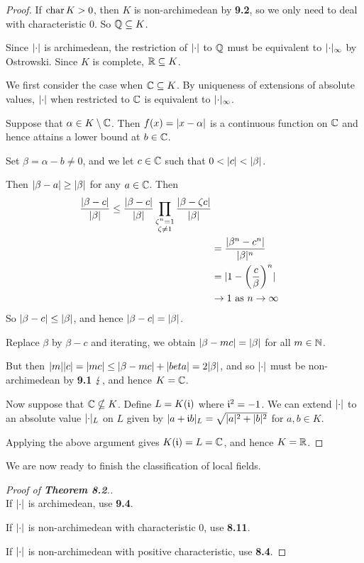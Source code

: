 \documentclass[10pt,a4paper]{article}
\begin{document}
\begin{proof}
  If $\operatorname{char} K > 0$, then $K$ is non-archimedean by \textbf{9.2}, so we only need to deal with characteristic 0. So $\mathbb{Q} \subseteq K$.

  Since $\lvert\cdot\rvert$ is archimedean, the restriction of $\lvert\cdot\rvert$ to $\mathbb{Q}$ must be equivalent to $\lvert\cdot\rvert_\infty$ by Ostrowski. Since $K$ is complete, $\mathbb{R} \subseteq K$.

  We first consider the case when $\mathbb{C} \subseteq K$. By uniqueness of extensions of absolute values, $\lvert\cdot\rvert$ when restricted to $\mathbb{C}$ is equivalent to $\lvert\cdot\rvert_\infty$.

  Suppose that $\alpha \in K \setminus \mathbb{C}$. Then $f(x)=\lvert x-\alpha\rvert$ is a continuous function on $\mathbb{C}$ and hence attains a lower bound at $b \in \mathbb{C}$.

  Set $\beta = \alpha - b \neq 0$, and we let $c \in \mathbb{C}$ such that $0<\lvert c\rvert<\lvert\beta\rvert$.

  Then $\lvert\beta-a\rvert \geq \lvert\beta\rvert$ for any $a \in \mathbb{C}$. Then
  \begin{align*}
    \frac{\lvert\beta-c\rvert}{\lvert\beta\rvert} \leq \frac{\lvert\beta-c\rvert}{\lvert\beta\rvert} \prod_{\substack{\zeta^n = 1\\\zeta\neq 1}} \frac{\lvert\beta-\zeta c\rvert}{\lvert\beta\rvert} \\
    &= \frac{\lvert\beta^n-c^n\rvert}{\lvert\beta\rvert^n}\\
    &=\lvert1-\left(\frac{c}{\beta}\right)^n\rvert\\
    &\to 1 \text{ as } n \to \infty
  \end{align*}
  So $\lvert\beta-c\rvert\leq \lvert\beta\rvert$, and hence $\lvert\beta-c\rvert = \lvert\beta\rvert$.

  Replace $\beta$ by $\beta-c$ and iterating, we obtain $\lvert\beta-mc\rvert = \lvert\beta\rvert$ for all $m \in \mathbb{N}$.

  But then $\lvert m\rvert\lvert c\rvert = \lvert mc\rvert \leq \lvert\beta-mc\rvert+\lvert beta\rvert = 2\lvert\beta\rvert$, and so $\lvert\cdot\rvert$ must be non-archimedean by \textbf{9.1} $\lightning$, and hence $K = \mathbb{C}$.

  Now suppose that $\mathbb{C} \nsubseteq K$. Define $L = K(\mathfrak{i})$ where $\mathfrak{i}^2 = -1$. We can extend $\lvert\cdot\rvert$ to an absolute value $\lvert\cdot\rvert_L$ on $L$ given by $\lvert a+\mathfrak{i} b\rvert_L = \sqrt{\lvert a\rvert^2 + \lvert b\rvert^2}$ for $a, b \in K$.

  Applying the above argument gives $K(\mathfrak{i}) = L = \mathbb{C}$, and hence $K = \mathbb{R}$.
\end{proof}
We are now ready to finish the classification of local fields.
\begin{proof}[Proof of \textbf{Theorem 8.2}.]\hspace*{0cm}\\
  If $\lvert\cdot\rvert$ is archimedean, use \textbf{9.4}.

  If $\lvert\cdot\rvert$ is non-archimedean with characteristic 0, use \textbf{8.11}.

  If $\lvert\cdot\rvert$ is non-archimedean with positive characteristic, use \textbf{8.4}.
\end{proof}
\end{document}
